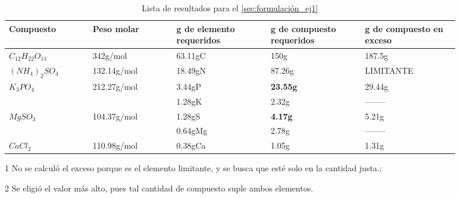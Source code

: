 \begin{table}[H]
\centering
\caption{Lista de resultados para el \autoref{sec:formulación_ej1}}
\label{tab:res_ej1}
\begin{threeparttable}
{
\begin{tabular}{p{0.16\linewidth}p{0.16\linewidth}p{0.185\linewidth}p{0.185\linewidth}p{0.185\linewidth}}\hline

    \textbf{Compuesto} & \textbf{Peso molar} & \textbf{g de elemento requeridos} & \textbf{g de compuesto requeridos} & \textbf{g de compuesto en exceso} \\ \hline
    
    $C_{12}H_{22}O_{11}$ &    342g/mol & 63.11gC  &            150g           &   187.5g  \\
    $(NH_{4})_{2}SO_{4}$ & 132.14g/mol & 18.49gN  &           87.26g          & LIMITANTE\tnote{1} \\
    $K_{3}PO_{4}$        & 212.27g/mol &  3.44gP  &  \textbf{23.55g}\tnote{2} &  29.44g   \\
                         &             &  1.28gK  &            2.32g          &  -------- \\
    $MgSO_{3}$           & 104.37g/mol &  1.28gS  &   \textbf{4.17g}\tnote{2} &   5.21g   \\
                         &             &  0.64gMg &            2.78g          &  -------- \\
    $CaCl_{2}$           & 110.98g/mol &  0.38gCa &            1.05g          &   1.31g   \\
    
    \hline
\end{tabular}
}
\begin{tablenotes} %
    \item[1] No se calculó el exceso porque es el elemento limitante, y se busca que esté solo en la cantidad justa.; 
    \item[2] Se eligió el valor más alto, pues tal cantidad de compuesto suple ambos elementos.
\end{tablenotes}
\end{threeparttable}
\end{table}